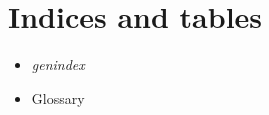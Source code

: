 \documentclass[letterpaper,10pt,english]{sphinxhowto}
\begin{document}
\section{Indices and tables}
\label{index:indices-and-tables}\begin{itemize}
\item {} 
\emph{genindex}

\end{itemize}
\begin{itemize}
\item {} 
Glossary

\end{itemize}



\renewcommand{\indexname}{Index}
\printindex
\end{document}
